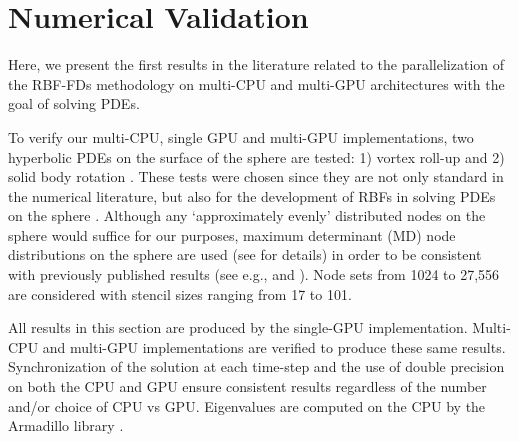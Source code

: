 \documentclass{report}
\begin{document}
\fi

\chapter{Numerical Validation} 

\label{chap:applications}

%



Here, we present the first results in the literature related to the parallelization of the RBF-FDs methodology on multi-CPU and multi-GPU architectures with the goal of solving PDEs. %

 To verify our multi-CPU, single GPU and multi-GPU implementations, two hyperbolic PDEs on the surface of the sphere are tested: 1) vortex roll-up \cite{NairTransport05, NairJablonowski08} and 2) solid body rotation \cite{JakobChien1995}. These tests were chosen since they are not only standard in the numerical literature, but also
for the development of RBFs in solving PDEs on the sphere \cite{FlyerWright07, Fornberg2008, FlyerLehto10, Fornberg2011a}. Although any `approximately evenly' distributed nodes on the sphere would suffice for our purposes, maximum determinant (MD) node distributions on the sphere are used (see \cite{Sloan2003} for details) in order to be consistent with previously published results (see e.g., \cite{FlyerWright07} and \cite{FornbergLehto11}). Node sets from 1024 to 27,556 are considered with stencil sizes ranging from 17 to 101.

All results in this section are produced by the single-GPU implementation. Multi-CPU and multi-GPU implementations are verified to produce these same results. Synchronization of the solution at each time-step and the use of double precision on both the CPU and GPU ensure consistent results regardless of the number and/or choice of CPU vs GPU. Eigenvalues are computed on the CPU by the Armadillo library \cite{armadillo2010}.
\end{document}
